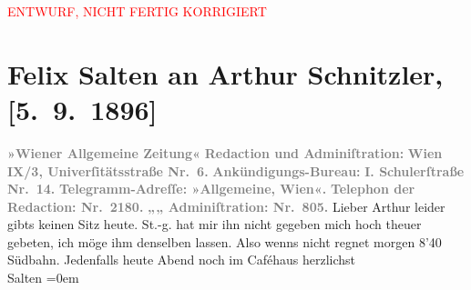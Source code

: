 
\begin{center}
            \textcolor{red}{ENTWURF, NICHT FERTIG KORRIGIERT}
                      \end{center}
            
         
         \renewcommand{\erwaehntePersonen}{Personen: Julian Sternberg}
         \renewcommand{\erwaehnteInstitutionen}{Institutionen: Südbahnstrecke, Wiener Allgemeine Zeitung}
         \renewcommand{\erwaehnteOrte}{Orte: Schulerstraße, Universitätsstraße, Wien}
         \renewcommand{\erwaehnteWerke}{}
               \section[Felix Salten an Arthur Schnitzler, {[}5. 9. 1896{]}]{ Felix Salten an Arthur Schnitzler, {[}5. 9. 1896{]}}\nopagebreak{}\rehead{ }\begin{ledgroupsized}[t]{13cm}\normalsize\beginnumbering \toendnotes[C]{\smallbreak\pagebreak[2]} 
\pstart
           \noindent{}{\pb}\textcolor{gray}{\textbf{\textbf{»Wiener Allgemeine
                        Zeitung«}}}\pend
           \pstart
           \textcolor{gray}{\textbf{Redaction und Adminiſtration:}}\pend
           \pstart
           \textcolor{gray}{\textbf{Wien}}\pend
           \pstart
           \textcolor{gray}{\textbf{\textbf{IX}/3, \textbf{Univerſitätsstraße Nr. 6}\textbf{.}}}\pend
           \pstart
           \textcolor{gray}{\textbf{Ankündigungs-Bureau:}}\pend
           \pstart
           \textcolor{gray}{\textbf{\textbf{I. Schulerſtraße Nr. 14. }}}\pend
           \pstart
           \textcolor{gray}{\textbf{Telegramm-Adreſſe: »Allgemeine, Wien«.}}\pend
           \pstart
           \textcolor{gray}{\textbf{Telephon der Redaction: Nr. 2180.}}\pend
           \pstart
           \textcolor{gray}{\textbf{\hspace*{2.5em}„\hspace*{2.5em}„\hspace*{2.5em} Adminiſtration: Nr. 805.}}\pend
           \pstart
           Lieber Arthur leider gibts keinen Sitz heute. St.-g. hat mir ihn nicht gegeben {\kaufmannsund} mich hoch {\kaufmannsund} theuer gebeten, ich möge ihm denselben
               lassen. \pend
           \pstart
           Also wenns nicht regnet morgen 8'40{ }Südbahn. \pend
           \pstart
           Jedenfalls heute Abend noch im Caféhaus \pend
           \pstart
           herzlichst {\\[\baselineskip]}\spacefill\mbox{Salten}\pend
           \leftskip=0em{}
         

\end{ledgroupsized}
